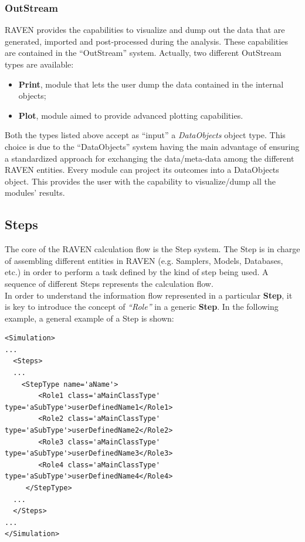 \subsubsection{OutStream}
RAVEN provides the capabilities to visualize and dump out the data that are generated, imported and 
post-processed during the analysis. These capabilities are contained in the ``OutStream'' system.
 Actually, two different OutStream types are available:
 \begin{itemize}
   \item \textbf{Print}, module that lets the user dump the data contained in the internal objects;
   \item \textbf{Plot}, module aimed to provide advanced plotting capabilities.
 \end{itemize}
Both the types listed above accept as ``input'' a \textit{DataObjects} object type. 
This choice is due to the ``DataObjects'' system  having the main advantage of ensuring a standardized approach for 
exchanging the data/meta-data among the different RAVEN entities. 
Every module can project its outcomes into a DataObjects object. This provides the 
user with the capability to visualize/dump all the modules' results. 

\subsection{Steps}
The core of the RAVEN calculation flow is the Step system. 
The Step is in charge of assembling different entities in RAVEN (e.g. Samplers, Models, Databases, etc.) in order to 
perform a task defined by the kind of step being used. A sequence of 
different Steps represents the calculation flow.
\\In order to understand the information flow represented in a particular \textbf{Step}, it is
key to introduce the concept of \textit{``Role''} in a generic  \textbf{Step}. 
In the following example, a general example of a Step is shown:
\begin{lstlisting}[style=XML,morekeywords={class}]
<Simulation>
...
  <Steps>
  ...
    <StepType name='aName'>
        <Role1 class='aMainClassType' type='aSubType'>userDefinedName1</Role1> 
        <Role2 class='aMainClassType' type='aSubType'>userDefinedName2</Role2> 
        <Role3 class='aMainClassType' type='aSubType'>userDefinedName3</Role3> 
        <Role4 class='aMainClassType' type='aSubType'>userDefinedName4</Role4> 
     </StepType>
  ...
  </Steps>
...
</Simulation>
\end{lstlisting}

